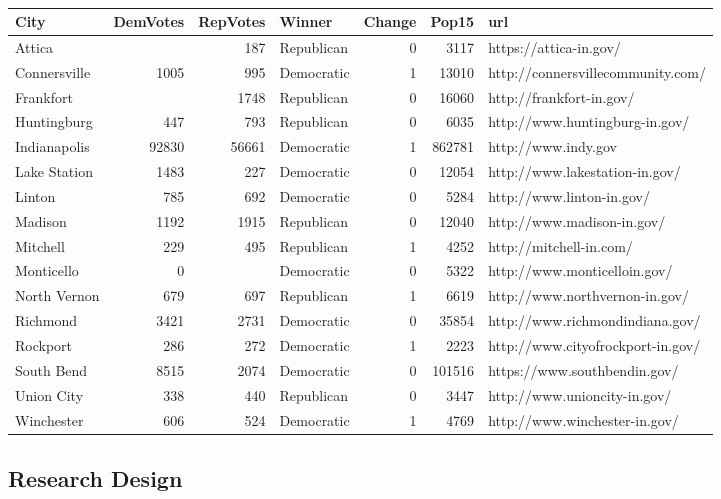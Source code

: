 \documentclass[11pt]{article}
\begin{document}
\begin{table}[ht]
	\centering
	\begin{tabular}{lrrlrrl}
		\hline
		City & DemVotes & RepVotes & Winner & Change & Pop15 & url \\ 
		\hline
		Attica &  & 187 & Republican & 0 & 3117 & https://attica-in.gov/ \\ 
		Connersville & 1005 & 995 & Democratic & 1 & 13010 & http://connersvillecommunity.com/ \\ 
		Frankfort &  & 1748 & Republican & 0 & 16060 & http://frankfort-in.gov/ \\ 
		Huntingburg & 447 & 793 & Republican & 0 & 6035 & http://www.huntingburg-in.gov/ \\ 
		Indianapolis & 92830 & 56661 & Democratic & 1 & 862781 & http://www.indy.gov \\ 
		Lake Station & 1483 & 227 & Democratic & 0 & 12054 & http://www.lakestation-in.gov/ \\ 
		Linton & 785 & 692 & Democratic & 0 & 5284 & http://www.linton-in.gov/ \\ 
		Madison & 1192 & 1915 & Republican & 0 & 12040 & http://www.madison-in.gov/ \\ 
		Mitchell & 229 & 495 & Republican & 1 & 4252 & http://mitchell-in.com/ \\ 
		Monticello & 0 &  & Democratic & 0 & 5322 & http://www.monticelloin.gov/ \\ 
		North Vernon & 679 & 697 & Republican & 1 & 6619 & http://www.northvernon-in.gov/ \\ 
		Richmond & 3421 & 2731 & Democratic & 0 & 35854 & http://www.richmondindiana.gov/ \\ 
		Rockport & 286 & 272 & Democratic & 1 & 2223 & http://www.cityofrockport-in.gov/ \\ 
		South Bend & 8515 & 2074 & Democratic & 0 & 101516 & https://www.southbendin.gov/ \\ 
		Union City & 338 & 440 & Republican & 0 & 3447 & http://www.unioncity-in.gov/ \\ 
		Winchester & 606 & 524 & Democratic & 1 & 4769 & http://www.winchester-in.gov/ \\ 
		\hline
	\end{tabular}
	\caption{} 
\end{table}

\subsection{Research Design}
\end{document}
